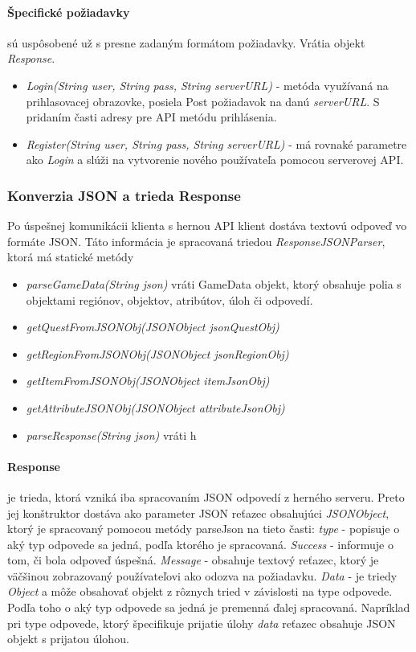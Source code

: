 \paragraph*{Špecifické požiadavky} sú uspôsobené už s presne zadaným formátom požiadavky. Vrátia objekt \emph{Response}.
\begin{itemize}
  \item \emph{Login(String user, String pass, String serverURL)} - metóda využívaná na prihlasovacej obrazovke, posiela Post požiadavok na danú \emph{serverURL}. S pridaním časti adresy pre API metódu prihlásenia.
  \item \emph{Register(String user, String pass, String serverURL)} - má rovnaké parametre ako \emph{Login} a slúži na vytvorenie nového používateľa pomocou serverovej API. 
\end{itemize}

\subsubsection{Konverzia JSON a trieda Response}
Po úspešnej komunikácii klienta s hernou API klient dostáva textovú odpoveď vo formáte JSON. Táto informácia je spracovaná triedou \emph{ResponseJSONParser}, ktorá má statické metódy
\begin{itemize}
   \item \emph{parseGameData(String json)} vráti GameData objekt, ktorý obsahuje polia s objektami regiónov, objektov, atribútov, úloh či odpovedí.
  \item \emph{getQuestFromJSONObj(JSONObject jsonQuestObj)}
   \item \emph{getRegionFromJSONObj(JSONObject jsonRegionObj)}
   \item \emph{getItemFromJSONObj(JSONObject itemJsonObj)}
   \item \emph{getAttributeJSONObj(JSONObject attributeJsonObj)}
   \item \emph{parseResponse(String json)} vráti h
\end{itemize}


\paragraph*{Response} je trieda, ktorá vzniká iba spracovaním JSON odpovedí z herného serveru. Preto jej konštruktor dostáva ako parameter JSON reťazec obsahujúci \emph{JSONObject}, ktorý je spracovaný pomocou metódy parseJson na tieto časti: \emph{type} - popisuje o aký typ odpovede sa jedná, podľa ktorého je spracovaná. \emph{Success} - informuje o tom, či bola odpoveď úspešná. \emph{Message} - obsahuje textový reťazec, ktorý je väčšinou zobrazovaný používateľovi ako odozva na požiadavku. \emph{Data} - je triedy \emph{Object} a môže obsahovať objekt z rôznych tried v závislosti na type odpovede. Podľa toho o aký typ odpovede sa jedná je premenná ďalej spracovaná. Napríklad pri type odpovede, ktorý špecifikuje prijatie úlohy \emph{data} reťazec obsahuje JSON objekt s prijatou úlohou.

